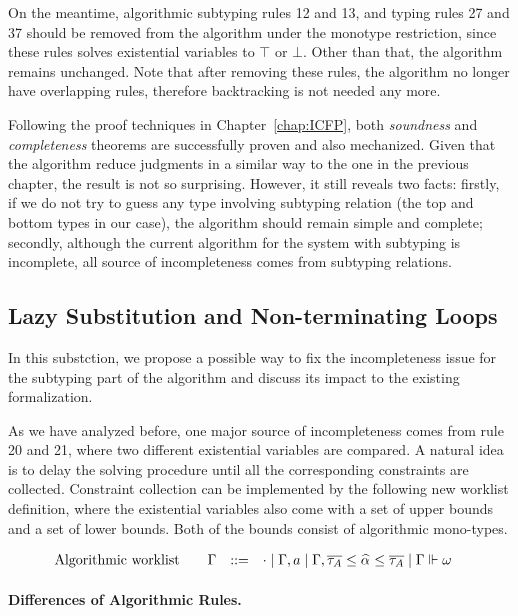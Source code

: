 On the meantime, algorithmic subtyping rules 12 and 13, and typing rules 27 and 37
should be removed from the algorithm under the monotype restriction,
since these rules solves existential variables to $\top$ or $\bot$.
Other than that, the algorithm remains unchanged.
Note that after removing these rules, the algorithm no longer have overlapping rules,
therefore backtracking is not needed any more.

Following the proof techniques in Chapter~\ref{chap:ICFP},
both \emph{soundness} and \emph{completeness} theorems
are successfully proven and also mechanized.
Given that the algorithm reduce judgments in a similar way to the one in the previous chapter,
the result is not so surprising.
However, it still reveals two facts:
firstly, if we do not try to guess any type involving subtyping relation
(the top and bottom types in our case),
the algorithm should remain simple and complete;
secondly, although the current algorithm for the system with subtyping is incomplete,
all source of incompleteness comes from subtyping relations.

\subsection{Lazy Substitution and Non-terminating Loops}\label{subsec:lazy_subst}
In this substction, we propose a possible way to fix the incompleteness issue
for the subtyping part of the algorithm and discuss its impact to the existing formalization.

As we have analyzed before,
one major source of incompleteness comes from rule 20 and 21,
where two different existential variables are compared.
A natural idea is to delay the solving procedure until all the corresponding
constraints are collected.
Constraint collection can be implemented by the following new worklist definition,
where the existential variables also come with a set of upper bounds
and a set of lower bounds. Both of the bounds consist of algorithmic mono-types.

\begin{gather*}
    \begin{aligned}
        \text{Algorithmic worklist}\qquad&\Gm &::=&\quad \cdot \mid \Gm, a \mid \Gm, \overline{\tau_A} \le \al \le \overline{\tau_A} \mid \Gm \Vdash \jg
    \end{aligned}
\end{gather*}

\paragraph{Differences of Algorithmic Rules.}

